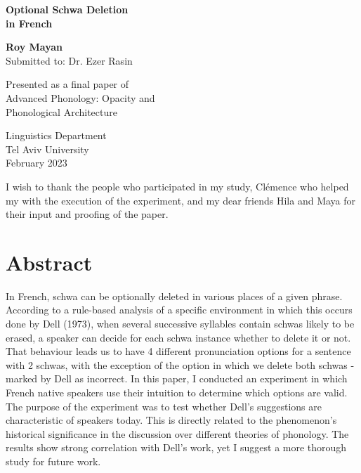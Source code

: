 \documentclass{article}
\begin{document}
	

\begin{titlepage}
    \begin{center}
        \vspace*{2cm}
        \Huge
        \textbf{Optional Schwa Deletion\\in French}
            
        \vspace{1.5cm}
        \LARGE
        \textbf{Roy Mayan}\\
        Submitted to: Dr. Ezer Rasin 
            
        \vfill
            
        Presented as a final paper of\\
        Advanced Phonology: Opacity and\\Phonological Architecture
            
        \vspace{0.8cm}
            
        \Large
        Linguistics Department\\
        Tel Aviv University\\
        February 2023
    \end{center}
\end{titlepage}

I wish to thank the people who participated in my study,  Clémence who helped my with the execution of the experiment, and my dear friends Hila and Maya for their input and proofing of the paper. 

\section*{Abstract}
{\sffamily\small
In French, schwa can be optionally deleted in various places of a given phrase. According to a rule-based analysis of a specific environment in which this occurs done by Dell (1973),  when several successive syllables contain schwas likely to be erased, a speaker can decide for each schwa instance whether to delete it or not. That behaviour leads us to have 4 different pronunciation options for a sentence with 2 schwas, with the exception of the option in which we delete both schwas - marked by Dell as incorrect. In this paper, I conducted an experiment in which French native speakers use their intuition to determine which options are valid. The purpose of the experiment was to test whether Dell's suggestions are characteristic of speakers today. This is directly related to the phenomenon's historical significance in the discussion over different theories of phonology. The results show strong correlation with Dell's work, yet I suggest a more thorough study for future work.}
\end{document}
